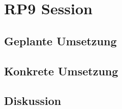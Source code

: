 \section{RP9 Session}
\label{sec:principle-rp9-session}

\subsection*{Geplante Umsetzung}


\subsection*{Konkrete Umsetzung}


\subsection*{Diskussion}
